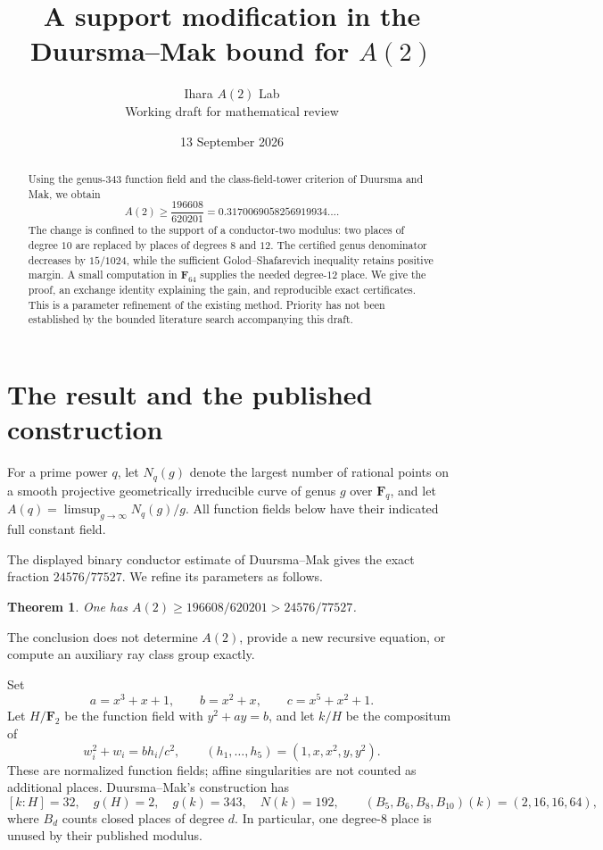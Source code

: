 \documentclass[11pt]{article}
\title{A support modification in the Duursma--Mak bound for $A(2)$}
\author{Ihara $A(2)$ Lab\\\small Working draft for mathematical review}
\date{13 September 2026}
\newtheorem{theorem}{Theorem}
\newcommand{\F}{\mathbf F}
\begin{document}
\maketitle
\begin{abstract}
Using the genus-$343$ function field and the class-field-tower criterion of
Duursma and Mak, we obtain
\[
 A(2)\ge \frac{196608}{620201}=0.3170069058256919934\ldots.
\]
The change is confined to the support of a conductor-two modulus: two places
of degree $10$ are replaced by places of degrees $8$ and $12$. The certified
genus denominator decreases by $15/1024$, while the sufficient
Golod--Shafarevich inequality retains positive margin. A small computation in
$\F_{64}$ supplies the needed degree-$12$ place. We give the proof, an
exchange identity explaining the gain, and reproducible exact certificates.
This is a parameter refinement of the existing method. Priority has not been
established by the bounded literature search accompanying this draft.
\end{abstract}

\section{The result and the published construction}
For a prime power $q$, let $N_q(g)$ denote the largest number of rational
points on a smooth projective geometrically irreducible curve of genus $g$
over $\F_q$, and let $A(q)=\limsup_{g\to\infty}N_q(g)/g$.
All function fields below have their indicated full constant field.

The displayed binary conductor estimate of Duursma--Mak\cite{DM} gives the
exact fraction $24576/77527$. We refine its parameters as follows.
\begin{theorem}\label{thm:main}
One has $A(2)\ge196608/620201>24576/77527$.
\end{theorem}
The conclusion does not determine $A(2)$, provide a new recursive equation,
or compute an auxiliary ray class group exactly.

Set
\[
 a=x^3+x+1,\qquad b=x^2+x,\qquad c=x^5+x^2+1.
\]
Let $H/\F_2$ be the function field with $y^2+ay=b$, and let $k/H$ be the
compositum of
\begin{equation}\label{eq:cover}
 w_i^2+w_i=bh_i/c^2,\qquad (h_1,\ldots,h_5)=(1,x,x^2,y,y^2).
\end{equation}
These are normalized function fields; affine singularities are not counted as
additional places. Duursma--Mak's construction has
\begin{equation}\label{eq:geometry}
 [k:H]=32,\quad g(H)=2,\quad g(k)=343,\quad N(k)=192,
 \qquad (B_5,B_6,B_8,B_{10})(k)=(2,16,16,64),
\end{equation}
where $B_d$ counts closed places of degree $d$. In particular, one degree-$8$
place is unused by their published modulus.
\end{document}
